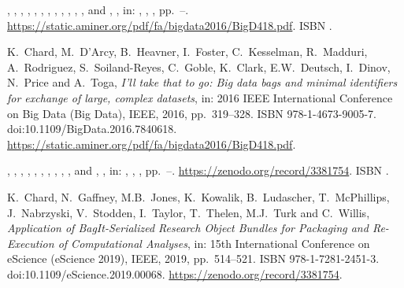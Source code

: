 \documentclass[ds,v1.1.2,openaccess]{iosart2x}%
\begin{document}
\begin{thebibliography}{}
%
\begin{bchapter}
,
,
,
,
,
,
,
,
,
,
,
,
 and
,
,
in: ,
,
,
pp.~--.
\url{https://static.aminer.org/pdf/fa/bigdata2016/BigD418.pdf}.
ISBN .
\end{bchapter}
%
\OrigBibText
K.~Chard,
M.~D'Arcy,
B.~Heavner,
I.~Foster,
C.~Kesselman,
R.~Madduri,
A.~Rodriguez,
S.~Soiland-Reyes,
C.~Goble,
K.~Clark,
E.W.~Deutsch,
I.~Dinov,
N.~Price and
A.~Toga,
\textit{I'll take that to go: Big data bags and minimal identifiers for
exchange of large, complex datasets},
in: 2016 {IEEE} International Conference on Big Data (Big Data),
IEEE,
2016,
pp.~319--328.
ISBN 978-1-4673-9005-7.
doi:10.1109/BigData.2016.7840618.
\url{https://static.aminer.org/pdf/fa/bigdata2016/BigD418.pdf}.
\endOrigBibText
{}
\endbibitem

%
\begin{bchapter}
,
,
,
,
,
,
,
,
,
,
 and
,
,
in: ,
,
,
pp.~--.
\url{https://zenodo.org/record/3381754}.
ISBN .
\end{bchapter}
%
\OrigBibText
K.~Chard,
N.~Gaffney,
M.B.~Jones,
K.~Kowalik,
B.~Ludascher,
T.~{McPhillips},
J.~Nabrzyski,
V.~Stodden,
I.~Taylor,
T.~Thelen,
M.J.~Turk and
C.~Willis,
\textit{Application of {BagIt}-Serialized Research Object Bundles for
Packaging and Re-Execution of Computational Analyses},
in: 15th International Conference on {eScience} ({eScience} 2019),
IEEE,
2019,
pp.~514--521.
ISBN 978-1-7281-2451-3.
doi:10.1109/eScience.2019.00068.
\url{https://zenodo.org/record/3381754}.
\endOrigBibText
{}
\endbibitem


\end{thebibliography}
\end{document}
